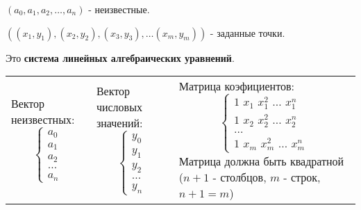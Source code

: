 \documentclass[12pt]{article}
\begin{document}
\( (a_0, a_1, a_2, \ldots , a_n) \) - неизвестные.

\( ((x_1, y_1), (x_2, y_2), (x_3, y_3), \ldots (x_m, y_m)) \) -
заданные точки.

\vspace{10pt}
Это \textbf{система линейных алгебраических уравнений}.
\vspace{10pt}

\begin{tabularx}{\textwidth}{XXX}
	{
		\centering
		Вектор неизвестных:
		\begin{equation*}
			\begin{cases}
				a_0    \\
				a_1    \\
				a_2    \\
				\ldots \\
				a_n
			\end{cases}
		\end{equation*}
	} &
	{
			\centering
			Вектор числовых значений:
			\begin{equation*}
				\begin{cases}
					y_0    \\
					y_1    \\
					y_2    \\
					\ldots \\
					y_n
				\end{cases}
			\end{equation*}
	} &
	{
			\centering
			Матрица коэфициентов:
			\begin{equation*}
				\begin{cases}
					1 \hspace{4pt} x_1 \hspace{4pt} x_1^2 \hspace{4pt} \ldots \hspace{4pt} x_1^n \\
					1 \hspace{4pt} x_2 \hspace{4pt} x_2^2 \hspace{4pt} \ldots \hspace{4pt} x_2^n \\
					\ldots                                                                       \\
					1 \hspace{4pt} x_m \hspace{4pt} x_m^2 \hspace{4pt} \ldots \hspace{4pt} x_m^n
				\end{cases}
			\end{equation*}
			Матрица должна быть квадратной (\( n+1 \) - столбцов, \( m \) - строк, \( n + 1 = m \))
		}
\end{tabularx}
\end{document}
